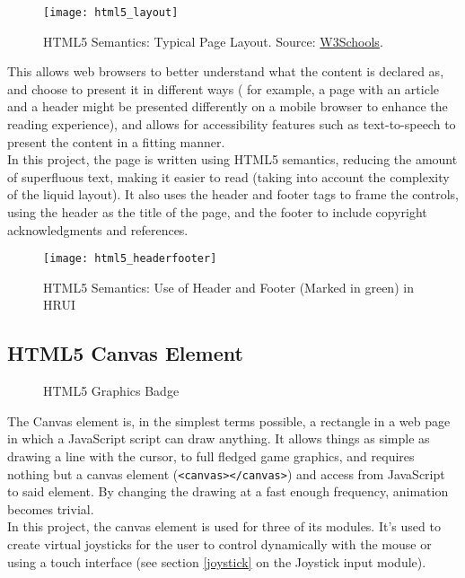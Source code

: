 \begin{figure}[h]
\begin{center}
  \texttt{[image: html5\_layout]}
  \end{center}
  \caption{HTML5 Semantics: Typical Page Layout. Source: \href{http://www.w3schools.com/html/html5_semantic_elements.asp}{
  W3Schools}.}
\end{figure}
This allows web browsers to better understand what the content is declared as, and choose to present it in different ways (
for example, a page with an article and a header might be presented differently on a mobile browser to enhance the reading 
experience), and allows for accessibility features such as text-to-speech to present the content in a fitting manner.\\

In this project, the page is written using HTML5 semantics, reducing the amount of superfluous text, making it easier to
read (taking into account the complexity of the liquid layout). It also uses the header and footer tags to frame the
controls, using the header as the title of the page, and the footer to include copyright acknowledgments and references.
\begin{figure}[h]
\begin{center}
  \texttt{[image: html5\_headerfooter]}
  \end{center}
  \caption{HTML5 Semantics: Use of Header and Footer (Marked in green) in HRUI}
\end{figure}
\subsection{HTML5 Canvas Element} \label{html5canvaselement}
\begin{figure}[h]
\centering

\caption{HTML5 Graphics Badge}
\end{figure}
The Canvas element is, in the simplest terms possible, a rectangle in a web page in which a JavaScript script can draw
anything. It allows things as simple as drawing a line with the cursor, to full fledged game graphics, and requires
nothing but a canvas element (\texttt{<canvas></canvas>}) and access from JavaScript to said element. By
changing the drawing at a fast enough frequency, animation becomes trivial.\\

In this project, the canvas element is used for three of its modules. It's used to create virtual joysticks for the user
to control dynamically with the mouse or using a touch interface (see section \ref{joystick} on the Joystick input module).\\

